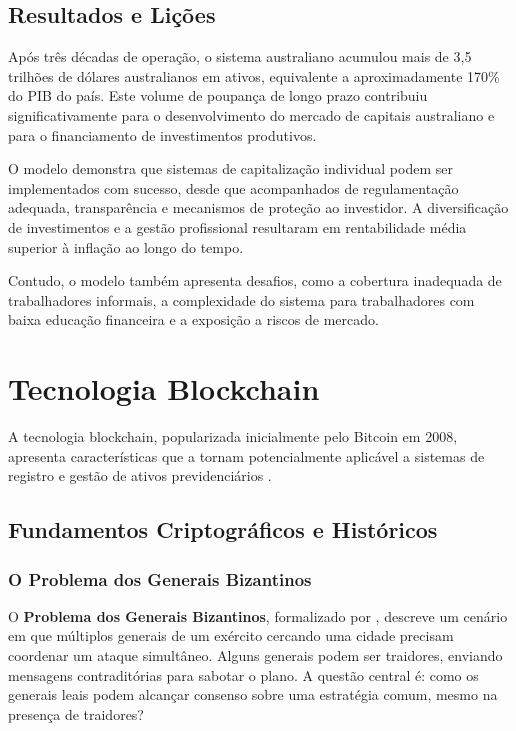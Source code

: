 \subsection{Resultados e Lições}

Após três décadas de operação, o sistema australiano acumulou mais de 3,5 trilhões de dólares australianos em ativos, equivalente a aproximadamente 170\% do PIB do país. Este volume de poupança de longo prazo contribuiu significativamente para o desenvolvimento do mercado de capitais australiano e para o financiamento de investimentos produtivos.

O modelo demonstra que sistemas de capitalização individual podem ser implementados com sucesso, desde que acompanhados de regulamentação adequada, transparência e mecanismos de proteção ao investidor. A diversificação de investimentos e a gestão profissional resultaram em rentabilidade média superior à inflação ao longo do tempo.

Contudo, o modelo também apresenta desafios, como a cobertura inadequada de trabalhadores informais, a complexidade do sistema para trabalhadores com baixa educação financeira e a exposição a riscos de mercado.

\section{Tecnologia Blockchain}

A tecnologia blockchain, popularizada inicialmente pelo Bitcoin em 2008, apresenta características que a tornam potencialmente aplicável a sistemas de registro e gestão de ativos previdenciários \cite{nakamoto2008}.

\subsection{Fundamentos Criptográficos e Históricos}

\subsubsection{O Problema dos Generais Bizantinos}

O \textbf{Problema dos Generais Bizantinos}, formalizado por , descreve um cenário em que múltiplos generais de um exército cercando uma cidade precisam coordenar um ataque simultâneo. Alguns generais podem ser traidores, enviando mensagens contraditórias para sabotar o plano. A questão central é: como os generais leais podem alcançar consenso sobre uma estratégia comum, mesmo na presença de traidores?

